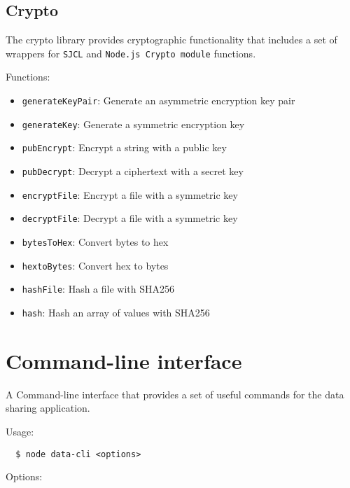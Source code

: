 \subsection{Crypto}
\label{implemenation:libs:cr}

The crypto library provides cryptographic functionality that includes a set of wrappers for \verb|SJCL| and \verb|Node.js Crypto module| functions.

Functions:

\begin{itemize}
  \item \verb|generateKeyPair|: Generate an asymmetric encryption key pair
  \item \verb|generateKey|: Generate a symmetric encryption key
  \item \verb|pubEncrypt|: Encrypt a string with a public key
  \item \verb|pubDecrypt|: Decrypt a ciphertext with a secret key
  \item \verb|encryptFile|: Encrypt a file with a symmetric key
  \item \verb|decryptFile|: Decrypt a file with a symmetric key
  \item \verb|bytesToHex|: Convert bytes to hex
  \item \verb|hextoBytes|: Convert hex to bytes
  \item \verb|hashFile|: Hash a file with SHA256
  \item \verb|hash|: Hash an array of values with SHA256
\end{itemize}

\section{Command-line interface}
\label{implemenation:cli}

A Command-line interface that provides a set of useful commands for the data sharing application.

Usage:

\begin{verbatim}
  $ node data-cli <options>
\end{verbatim}

Options:


